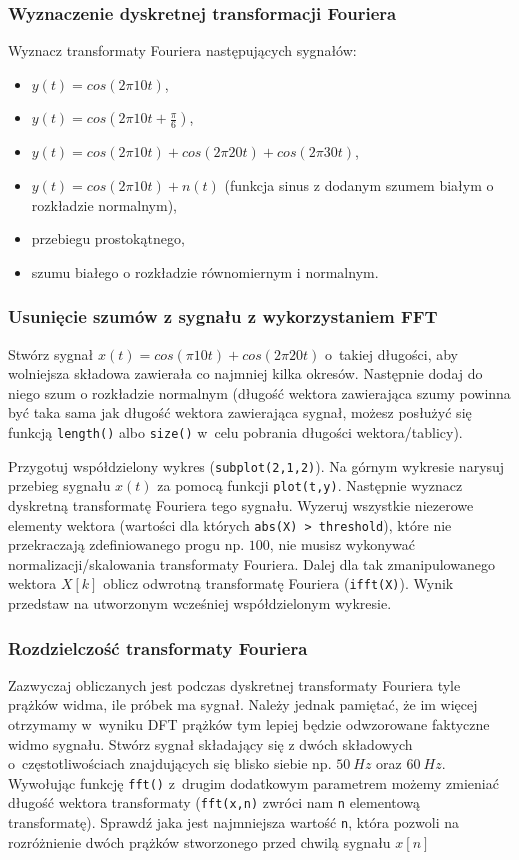 \subsubsection{Wyznaczenie dyskretnej transformacji Fouriera}
Wyznacz transformaty Fouriera następujących sygnałów:
\begin{itemize}
	\item $y(t) = cos(2\pi10t)$,
	\item $y(t) = cos(2\pi10t + \frac{\pi}{6})$,
	\item $y(t) = cos(2\pi10t) + cos(2\pi20t) + cos(2\pi30t)$,
	\item $y(t) = cos(2\pi10t) + n(t)$ (funkcja sinus z dodanym szumem białym o rozkładzie normalnym),
	\item przebiegu prostokątnego,
	\item szumu białego o rozkładzie równomiernym i normalnym.
\end{itemize}

\subsubsection{Usunięcie szumów z sygnału z wykorzystaniem FFT}
Stwórz sygnał $x(t) = cos(\pi10t) + cos(2\pi20t)$ o~takiej długości, aby wolniejsza składowa zawierała co najmniej kilka okresów. Następnie dodaj do niego szum o rozkładzie normalnym (długość wektora zawierająca szumy powinna być taka sama jak długość wektora zawierająca sygnał, możesz posłużyć się funkcją \texttt{length()} albo \texttt{size()} w~celu pobrania długości wektora/tablicy). 

Przygotuj współdzielony wykres (\texttt{subplot(2,1,2)}). Na górnym wykresie narysuj przebieg sygnału $x(t)$ za pomocą funkcji \texttt{plot(t,y)}. Następnie wyznacz dyskretną transformatę Fouriera tego sygnału. Wyzeruj wszystkie niezerowe elementy wektora (wartości dla których \texttt{abs(X) > threshold}), które nie przekraczają zdefiniowanego progu np. $100$, nie musisz wykonywać normalizacji/skalowania transformaty Fouriera. Dalej dla tak zmanipulowanego wektora $X[k]$ oblicz odwrotną transformatę Fouriera (\texttt{ifft(X)}). Wynik przedstaw na utworzonym wcześniej współdzielonym wykresie. 

\subsubsection{Rozdzielczość transformaty Fouriera}
Zazwyczaj obliczanych jest podczas dyskretnej transformaty Fouriera tyle prążków widma, ile próbek ma sygnał. Należy jednak pamiętać, że im więcej otrzymamy w~wyniku DFT prążków tym lepiej będzie odwzorowane faktyczne widmo sygnału. Stwórz sygnał składający się z dwóch składowych o~częstotliwościach znajdujących się blisko siebie np. $50~Hz$ oraz $60~Hz$. Wywołując funkcję \texttt{fft()} z~drugim dodatkowym parametrem możemy zmieniać długość wektora transformaty (\texttt{fft(x,n)} zwróci nam \texttt{n} elementową transformatę). Sprawdź jaka jest najmniejsza wartość \texttt{n}, która pozwoli na rozróżnienie dwóch prążków stworzonego przed chwilą sygnału $x[n]$

